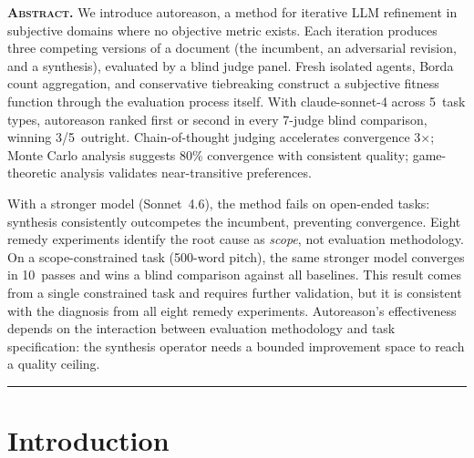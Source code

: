 \documentclass[10pt,twocolumn]{article}
\begin{document}

\noindent\textbf{\scshape Abstract.}\enspace
We introduce autoreason, a method for iterative LLM refinement in subjective domains where no objective metric exists. Each iteration produces three competing versions of a document (the incumbent, an adversarial revision, and a synthesis), evaluated by a blind judge panel. Fresh isolated agents, Borda count aggregation, and conservative tiebreaking construct a subjective fitness function through the evaluation process itself. With claude-sonnet-4 across 5~task types, autoreason ranked first or second in every 7-judge blind comparison, winning 3/5~outright. Chain-of-thought judging accelerates convergence 3$\times$; Monte Carlo analysis suggests 80\% convergence with consistent quality; game-theoretic analysis validates near-transitive preferences.

With a stronger model (Sonnet~4.6), the method fails on open-ended tasks: synthesis consistently outcompetes the incumbent, preventing convergence. Eight remedy experiments identify the root cause as \textit{scope}, not evaluation methodology. On a scope-constrained task (500-word pitch), the same stronger model converges in 10~passes and wins a blind comparison against all baselines. This result comes from a single constrained task and requires further validation, but it is consistent with the diagnosis from all eight remedy experiments. Autoreason's effectiveness depends on the interaction between evaluation methodology and task specification: the synthesis operator needs a bounded improvement space to reach a quality ceiling.

\vspace{6pt}
\hrule
\vspace{6pt}

\section{Introduction}
\end{document}
